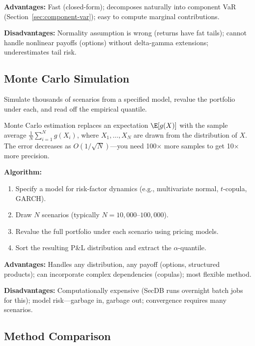\textbf{Advantages:} Fast (closed-form); decomposes naturally into
component VaR (Section~\ref{sec:component-var}); easy to compute
marginal contributions.

\textbf{Disadvantages:} Normality assumption is wrong (returns have fat
tails); cannot handle nonlinear payoffs (options) without delta-gamma
extensions; underestimates tail risk.

\subsection{Monte Carlo Simulation}
\label{subsec:monte-carlo}

Simulate thousands of scenarios from a specified model, revalue the
portfolio under each, and read off the empirical quantile.

\begin{prereq}
Monte Carlo estimation replaces an expectation
$\E[g(X)]$ with the sample average
$\frac{1}{N}\sum_{i=1}^N g(X_i)$, where $X_1,\ldots,X_N$ are
drawn from the distribution of $X$.  The error decreases as
$O(1/\sqrt{N})$---you need 100$\times$ more samples to get 10$\times$
more precision.
\end{prereq}

\textbf{Algorithm:}
\begin{enumerate}[nosep]
  \item Specify a model for risk-factor dynamics (e.g., multivariate
        normal, $t$-copula, GARCH).
  \item Draw $N$ scenarios (typically $N=10{,}000$--$100{,}000$).
  \item Revalue the full portfolio under each scenario using pricing
        models.
  \item Sort the resulting P\&L distribution and extract the
        $\alpha$-quantile.
\end{enumerate}

\textbf{Advantages:} Handles any distribution, any payoff (options,
structured products); can incorporate complex dependencies (copulas);
most flexible method.

\textbf{Disadvantages:} Computationally expensive (SecDB runs overnight
batch jobs for this); model risk---garbage in, garbage out; convergence
requires many scenarios.

\subsection{Method Comparison}

